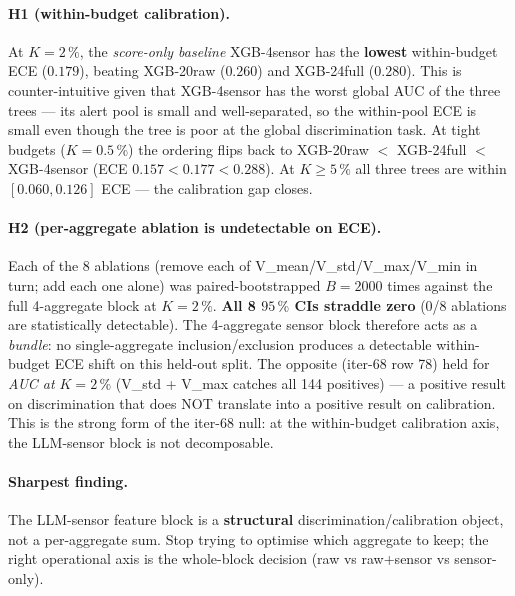 \documentclass{article}
\begin{document}
\paragraph{H1 (within-budget calibration).}
At $K{=}2\,\%$, the \emph{score-only baseline} XGB-4sensor has the
\textbf{lowest} within-budget ECE ($0.179$), beating XGB-20raw
($0.260$) and XGB-24full ($0.280$). This is counter-intuitive given
that XGB-4sensor has the worst global AUC of the three trees ---
its alert pool is small and well-separated, so the within-pool
ECE is small even though the tree is poor at the global
discrimination task. At tight budgets ($K{=}0.5\,\%$) the ordering
flips back to XGB-20raw $<$ XGB-24full $<$ XGB-4sensor (ECE
$0.157 < 0.177 < 0.288$). At $K \geq 5\,\%$ all three trees are
within $[0.060, 0.126]$ ECE --- the calibration gap closes.

\paragraph{H2 (per-aggregate ablation is undetectable on ECE).}
Each of the 8 ablations (remove each of V\_mean/V\_std/V\_max/V\_min in
turn; add each one alone) was paired-bootstrapped $B{=}2000$ times
against the full 4-aggregate block at $K{=}2\,\%$. \textbf{All 8
$95\,\%$ CIs straddle zero} (0/8 ablations are statistically
detectable). The 4-aggregate sensor block therefore acts as a
\emph{bundle}: no single-aggregate inclusion/exclusion produces a
detectable within-budget ECE shift on this held-out split. The
opposite (iter-68 row 78) held for \emph{AUC at $K{=}2\,\%$}
(V\_std + V\_max catches all 144 positives) --- a positive result on
discrimination that does NOT translate into a positive result on
calibration. This is the strong form of the iter-68 null: at the
within-budget calibration axis, the LLM-sensor block is not
decomposable.

\paragraph{Sharpest finding.}
The LLM-sensor feature block is a \textbf{structural}
discrimination/calibration object, not a per-aggregate sum. Stop
trying to optimise which aggregate to keep; the right operational
axis is the whole-block decision (raw vs raw+sensor vs sensor-only).
\end{document}
